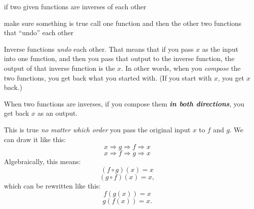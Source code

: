\documentclass[fleqn,letterpaper,12pt,printwatermark=false]{memoir}
\begin{document}
\newcommand{\myClassName}{Pre-AP Algebra 2}
\newcommand{\myUnitNumber}{1}
\newcommand{\myUnitTitle}{Introduction to Functions}
\newcommand{\myLessonNumber}{11}
\newcommand{\myLessonTitle}{Verifying Inverses}


\pagestyle{myPagestyle}

\checkandfixthelayout
{}

\begin{myNotesHeader}
    \item {} if two given functions are inverses of each other
\end{myNotesHeader}

\begin{myVocabulary}
        {
            make sure something is true
        }
        {
            call one function and then the other
        }
        {
            two functions that ``undo'' each other
        }
\end{myVocabulary}

\begin{myLesson}
    Inverse functions \emph{undo} each other.
    That means that if you pass $x$ as the input into one function,
    and then you pass that output to the inverse function,
    the output of that inverse function is the $x$.
    In other words,
    when you \emph{compose} the two functions,
    you get back what you started with.
    (If you start with $x$, you get $x$ back.)

    \begin{myLessonBox}
        When two functions are inverses,
        if you compose them 
        {\bfseries\itshape in both directions},
        you get back $x$ as an output.
    \end{myLessonBox}

    This is true 
    \emph{no matter which order} you pass the original input $x$
    to $f$ and $g$.
    We can draw it like this:
    \[
        x 
        \Longrightarrow 
        g 
        \Longrightarrow 
        f
        \Longrightarrow 
        x
    \]
    \[
        x 
        \Longrightarrow 
        f 
        \Longrightarrow 
        g 
        \Longrightarrow 
        x
    \]
    Algebraically, this means:
    \[
        (f \circ g)(x) = x
    \]
    \[
        (g \circ f)(x) = x,
    \]
    which can be rewritten like this:
    \[
        f(g(x)) = x
    \]
    \[
        g(f(x)) = x.
    \]
\end{myLesson}
\end{document}
